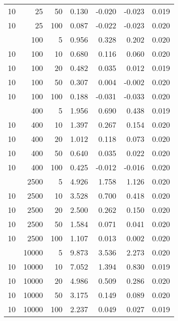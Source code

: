 \begin{table}
\begin{tabular}[t]{lrrrrrr}
10 & 25 & 50 & 0.130 & -0.020 & -0.023 & 0.019\\
10 & 25 & 100 & 0.087 & -0.022 & -0.023 & 0.020\\
\addlinespace
10 & 100 & 5 & 0.956 & 0.328 & 0.202 & 0.020\\
10 & 100 & 10 & 0.680 & 0.116 & 0.060 & 0.020\\
10 & 100 & 20 & 0.482 & 0.035 & 0.012 & 0.019\\
10 & 100 & 50 & 0.307 & 0.004 & -0.002 & 0.020\\
10 & 100 & 100 & 0.188 & -0.031 & -0.033 & 0.020\\
\addlinespace
10 & 400 & 5 & 1.956 & 0.690 & 0.438 & 0.019\\
10 & 400 & 10 & 1.397 & 0.267 & 0.154 & 0.020\\
10 & 400 & 20 & 1.012 & 0.118 & 0.073 & 0.020\\
10 & 400 & 50 & 0.640 & 0.035 & 0.022 & 0.020\\
10 & 400 & 100 & 0.425 & -0.012 & -0.016 & 0.020\\
\addlinespace
10 & 2500 & 5 & 4.926 & 1.758 & 1.126 & 0.020\\
10 & 2500 & 10 & 3.528 & 0.700 & 0.418 & 0.020\\
10 & 2500 & 20 & 2.500 & 0.262 & 0.150 & 0.020\\
10 & 2500 & 50 & 1.584 & 0.071 & 0.041 & 0.020\\
10 & 2500 & 100 & 1.107 & 0.013 & 0.002 & 0.020\\
\addlinespace
10 & 10000 & 5 & 9.873 & 3.536 & 2.273 & 0.020\\
10 & 10000 & 10 & 7.052 & 1.394 & 0.830 & 0.019\\
10 & 10000 & 20 & 4.986 & 0.509 & 0.286 & 0.020\\
10 & 10000 & 50 & 3.175 & 0.149 & 0.089 & 0.020\\
10 & 10000 & 100 & 2.237 & 0.049 & 0.027 & 0.019\\
\bottomrule
\end{tabular}
\end{table}
